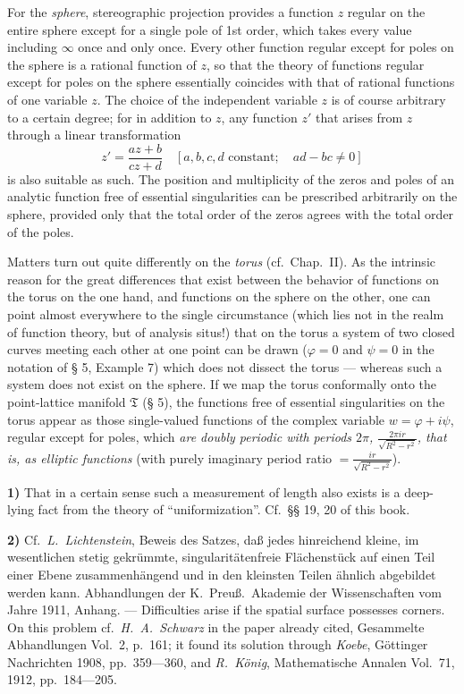 \documentclass{article}
\begin{document}
For the \emph{sphere}, stereographic projection provides a function $z$ regular on the entire sphere except for a single pole of 1st order, which takes every value including $\infty$ once and only once. Every other function regular except for poles on the sphere is a rational function of $z$, so that the theory of functions regular except for poles on the sphere essentially coincides with that of rational functions of one variable $z$. The choice of the independent variable $z$ is of course arbitrary to a certain degree; for in addition to $z$, any function $z'$ that arises from $z$ through a linear transformation
\[ z' = \frac{az + b}{cz + d} \quad [a, b, c, d \text{ constant}; \quad ad - bc \neq 0] \]
is also suitable as such. The position and multiplicity of the zeros and poles of an analytic function free of essential singularities can be prescribed arbitrarily on the sphere, provided only that the total order of the zeros agrees with the total order of the poles.

Matters turn out quite differently on the \emph{torus} (cf.\ Chap.\ II). As the intrinsic reason for the great differences that exist between the behavior of functions on the torus on the one hand, and functions on the sphere on the other, one can point almost everywhere to the single circumstance (which lies not in the realm of function theory, but of analysis situs!) that on the torus a system of two closed curves meeting each other at one point can be drawn ($\varphi = 0$ and $\psi = 0$ in the notation of § 5, Example 7) which does not dissect the torus --- whereas such a system does not exist on the sphere. If we map the torus conformally onto the point-lattice manifold $\mathfrak{T}$ (§ 5), the functions free of essential singularities on the torus appear as those single-valued functions of the complex variable $w = \varphi + i\psi$, regular except for poles, which \emph{are doubly periodic with periods $2\pi$, $\frac{2\pi ir}{\sqrt{R^2 - r^2}}$, that is, as elliptic functions} (with purely imaginary period ratio $= \frac{ir}{\sqrt{R^2 - r^2}}$).

\textbf{1)} That in a certain sense such a measurement of length also exists is a deep-lying fact from the theory of ``uniformization''. Cf.\ §§ 19, 20 of this book.

\textbf{2)} Cf.\ \emph{L.~Lichtenstein}, Beweis des Satzes, daß jedes hinreichend kleine, im wesentlichen stetig gekrümmte, singularitätenfreie Flächenstück auf einen Teil einer Ebene zusammenhängend und in den kleinsten Teilen ähnlich abgebildet werden kann. Abhandlungen der K.~Preuß.\ Akademie der Wissenschaften vom Jahre 1911, Anhang. --- Difficulties arise if the spatial surface possesses corners. On this problem cf.\ \emph{H.~A.~Schwarz} in the paper already cited, Gesammelte Abhandlungen Vol.\ 2, p.\ 161; it found its solution through \emph{Koebe}, Göttinger Nachrichten 1908, pp.\ 359---360, and \emph{R.~König}, Mathematische Annalen Vol.\ 71, 1912, pp.\ 184---205.
\end{document}

